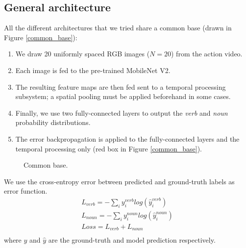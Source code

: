 \documentclass[12pt, a4paper]{report}
\begin{document}
			\subsection{General architecture}
				All the different architectures that we tried share a common base (drawn in Figure \ref{common_base}):
				\begin{enumerate}
					\item We draw 20 uniformly spaced RGB images ($N=20$) from the action video.
					\item Each image is fed to the pre-trained MobileNet V2.
					\item The resulting feature maps are then fed sent to a temporal processing subsystem; a spatial pooling must be applied beforehand in some cases.
					\item Finally, we use two fully-connected layers to output the {\itshape verb} and {\itshape noun} probability distributions.
					\item The error backpropagation is applied to the fully-connected layers and the temporal processing only (red box in Figure \ref{common_base}).
				\end{enumerate}
				\begin{figure}[h!]
					\centering
					\caption{Common base.}
				\end{figure}
				We use the cross-entropy error between predicted and ground-truth labels as error function.
				\begin{align*}
					L_{verb} = -\sum_{i} y^{verb}_{i}log(\hat{y}^{verb}_{i}) \\
					L_{noun} = -\sum_{i} y^{noun}_{i}log(\hat{y}^{noun}_{i}) \\
					Loss = L_{verb} + L_{noun} \\
				\end{align*}
				where $y$ and $\hat{y}$ are the ground-truth and model prediction respectively.
\end{document}
